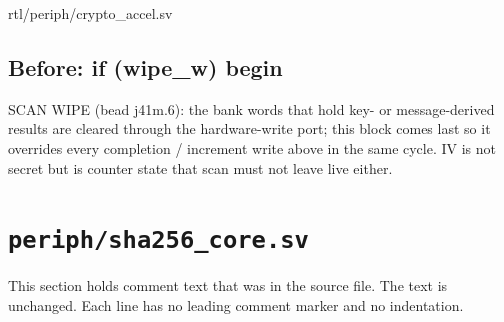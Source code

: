 \begin{relocated}{rtl/periph/crypto_accel.sv}
\subsection*{Before: if (wipe\_w) begin}

\begin{textblock}
SCAN WIPE (bead j41m.6): the bank words that hold key- or message-derived results are
cleared through the hardware-write port; this block comes last so it overrides every
completion / increment write above in the same cycle. IV is not secret but is counter
state that scan must not leave live either.
\end{textblock}

\end{relocated}

\section{\texttt{periph/sha256\_core.sv}}\label{tm:mod:sha256-core}

This section holds comment text that was in the source file. The text is unchanged. Each line has no leading comment marker and no indentation.

